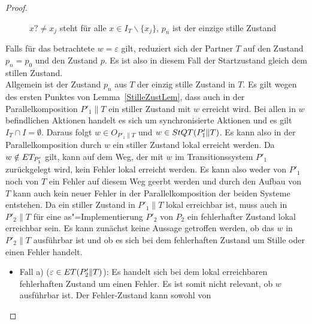 \begin{proof}
\begin{figure} [h!tbp]
\begin{center}
    \caption{$x?\neq x_j$ steht für alle $x\in I_T\backslash\{x_j\}$, $p_n$
    ist der einzige stille Zustand}
  \label{TohneEmitI}
  \end{center}
  \end{figure}
  Falls für das betrachtete $w=\varepsilon$ gilt, reduziert sich der Partner
  $T$ auf den Zustand $p_n=p_0$ und den Zustand $p$. Es ist also in diesem Fall
  der Startzustand gleich dem stillen Zustand.\\
  Allgemein ist der Zustand $p_n$ aus $T$ der einzig stille Zustand in $T$. Es
  gilt wegen des ersten Punktes von Lemma~\ref{StilleZustLem}, dass auch in der
  Parallelkomposition $P'_1\|T$ ein stiller Zustand mit $w$ erreicht wird. Bei
  allen in $w$ befindlichen Aktionen handelt es sich um synchronisierte
  Aktionen und es gilt $I_T\cap I=\emptyset$. Daraus folgt $w\in O_{P'_1\|T}$
  und $w\in StQT (P'_1\|T)$. Es kann also in der Parallelkomposition durch $w$
  ein stiller Zustand lokal erreicht werden. Da $w\notin ET _{P'_1}$ gilt, kann
  auf dem Weg, der mit $w$ im Transitionssystem $P'_1$ zurückgelegt wird, kein
  Fehler lokal erreicht werden. Es kann also weder von $P'_1$ noch von $T$ ein
  Fehler auf diesem Weg geerbt werden und durch den Aufbau von $T$ kann auch
  kein neuer Fehler in der Parallelkomposition der beiden Systeme entstehen. Da
  ein stiller Zustand in $P'_1\|T$ lokal erreichbar ist, muss auch in $P'_2\|T$
  für eine as"=Implementierung $P'_2$ von $P_2$ ein fehlerhafter Zustand lokal
  erreichbar sein. Es kann zunächst keine Aussage getroffen werden, ob das $w$
  in $P'_2\|T$ ausführbar ist und ob es sich bei dem fehlerhaften Zustand um
  Stille oder einen Fehler handelt.
  \begin{itemize}
    \item Fall a) ($\varepsilon\in ET (P'_2\|T)$): Es handelt sich bei dem
      lokal erreichbaren fehlerhaften Zustand um einen Fehler. Es ist somit
      nicht relevant, ob $w$ ausführbar ist. Der Fehler-Zustand kann sowohl von

\end{itemize}
\end{proof}

